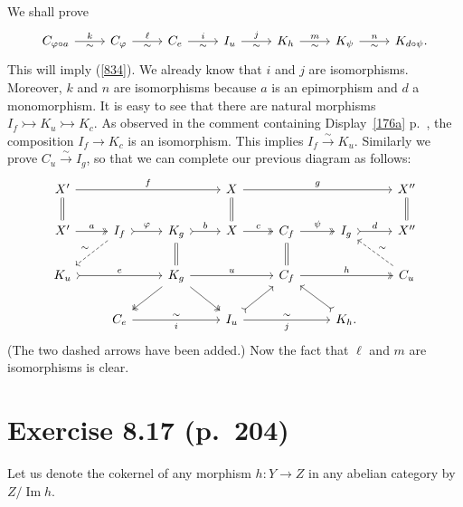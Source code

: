 \documentclass[12pt]{article}
\theoremstyle{remark}
\theoremstyle{definition}
\newcommand{\mono}{\rightarrowtail}
\newcommand{\p}{\varphi}
\newcommand{\xr}{\xrightarrow}
\newcommand{\ccd}{the comment containing Display}
\DeclareMathOperator{\Ima}{Im}
\begin{document}
We shall prove 
$$
\begin{tikzcd}
C_{\p\circ a}\ar{r}{k}[swap]{\sim}&C_\p\ar{r}{\ell}[swap]{\sim}&C_e\ar{r}{i}[swap]{\sim}&I_u\ar{r}{j}[swap]{\sim}&K_h\ar{r}{m}[swap]{\sim}&K_\psi\ar{r}{n}[swap]{\sim}&K_{d\circ\psi}.
\end{tikzcd}
$$
This will imply (\ref{834}). We already know that $i$ and $j$ are isomorphisms. Moreover, $k$ and $n$ are isomorphisms because $a$ is an epimorphism and $d$ a monomorphism. It is easy to see that there are natural morphisms $I_f\mono K_u\mono K_c$. As observed in \ccd\ \eqref{176a} p.~\pageref{176a}, the composition $I_f\to K_c$ is an isomorphism. This implies $I_f\xr\sim K_u$. Similarly we prove $C_u\xr\sim I_g$, so that we can complete our previous diagram as follows: 
$$
\begin{tikzcd}
X'\ar{rrr}{f}\ar[equal]{d}&&&X\ar[equal]{d}\ar{rrr}{g}&&&X''\ar[equal]{d}\\ 
X'\ar[two heads]{r}{a}&I_f\ar[dashed]{dl}[swap]{\sim}\ar[tail]{r}{\p}&K_g\ar[equal]{d}\ar[tail]{r}{b}&X\ar[two heads]{r}{c}&C_f\ar[equal]{d}\ar[two heads]{r}{\psi}&I_g\ar[tail]{r}{d}&X''\\ 
K_u\ar[tail]{rr}{e}&&K_g\ar[two heads]{dl}\ar[two heads]{dr}\ar{rr}{u}&&C_f\ar[two heads]{rr}{h}&&C_u\ar[dashed]{ul}[swap]{\sim}\\ 
&C_e\ar{rr}{\sim}[swap]{i}&&I_u\ar[tail]{ur}\ar{rr}{\sim}[swap]{j}&&K_h.\ar[tail]{ul}
\end{tikzcd}
$$ 
(The two dashed arrows have been added.) Now the fact that $\ell$ and $m$ are isomorphisms is clear. 
%
\section{Exercise 8.17 (p.~204)}\label{817} 
%
Let us denote the cokernel of any morphism $h:Y\to Z$ in any abelian category by $Z/\Ima h$. 
\end{document}
